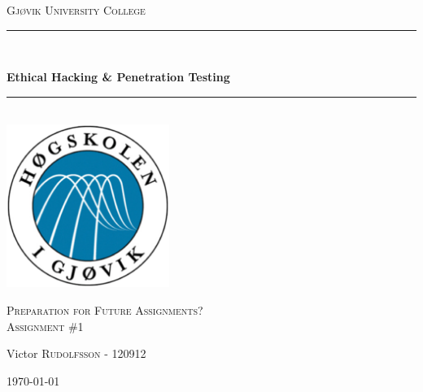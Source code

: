 \documentclass[12pt]{article} %
\begin{document}

\begin{titlepage}

\newcommand{\HRule}{\rule{\linewidth}{0.5mm}} %

\center %
\begin{myfont}
\textsc{{\large Gjøvik University College}}\\[0.5cm] %
\end{myfont}
\HRule \\[0.4cm]

\begin{myfont}
{ \huge \bfseries Ethical Hacking \& Penetration Testing}\\[0cm] %
\end{myfont}

\HRule \\[0.4cm]
\includegraphics[width=200px, height=200px]{logo}\\[0.8cm] %
\begin{myfont}
\textsc{\Large Preparation for Future Assignments?}\\[0.5cm] %
\textsc{\large Assignment \#1}\\[0.5cm] %
\end{myfont}


\begin{minipage}{0.44\textwidth}
\begin{flushleft} \large
\begin{myfont}
Victor \textsc{Rudolfsson} - 120912\\ %
\end{myfont}
\end{flushleft}
\end{minipage}



\vfill %
{\large \today}\\[3cm] %

\end{titlepage}
\end{document}
